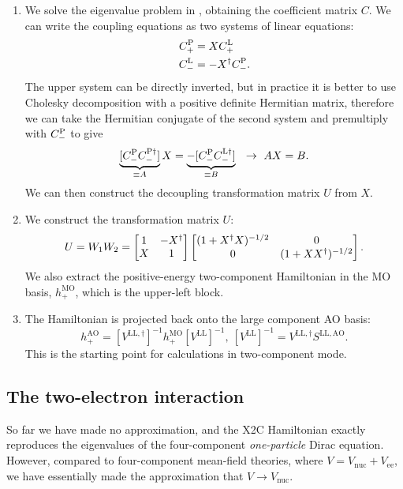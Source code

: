 \documentclass{article}
\begin{document}
\begin{enumerate}
\item We solve the eigenvalue problem in , obtaining the coefficient matrix $C$. We can write the coupling equations as two systems of linear equations:
\begin{align}
    C^{\mathrm{P}}_+&=XC^{\mathrm{L}}_+\\
    C^{\mathrm{L}}_-&=-X^{\dagger}C^{\mathrm{P}}_-.
\end{align}
The upper system can be directly inverted, but in practice it is better to use Cholesky decomposition with a positive definite Hermitian matrix, therefore we can take the Hermitian conjugate of the second system and premultiply with $C^{\mathrm{P}}_-$ to give
\begin{equation}
\label{eq:x_expr}
    \underbrace{[C\plc_- C_-^{\mathrm{P}\dagger}]}_{\equiv A}X = \underbrace{-[C_-\plc C_-^{\mathrm{L}\dagger}]}_{\equiv B} \ \ \rightarrow\ AX=B.
\end{equation}
We can then construct the decoupling transformation matrix $U$ from $X$.
\item We construct the transformation matrix $U$:
\begin{equation}
    U=W_1W_2=\begin{bmatrix}{1}&{-X^{\dagger}}\\{X}&{1}\end{bmatrix}\begin{bmatrix}{ (1+X^{\dagger}X)^{-1/2} }&{0}\\{0}&{ (1+XX^{\dagger})^{-1/2} }\end{bmatrix}.
\end{equation}
We also extract the positive-energy two-component Hamiltonian in the MO basis, $h^{\mathrm{MO}}_+$, which is the upper-left block.
\item The Hamiltonian is projected back onto the large component AO basis:
\begin{equation}
    h_+^{\mathrm{AO}}=[V^{\mathrm{LL},\dagger}]^{-1}h_+^{\mathrm{MO}}[V^{\mathrm{LL}}]^{-1},\ [V^{\mathrm{LL}}]^{-1}=V^{\mathrm{LL},\dagger}S^{\mathrm{LL, AO}}.
\end{equation}
This is the starting point for calculations in two-component mode.
\end{enumerate}

\subsection{The two-electron interaction}
So far we have made no approximation, and the X2C Hamiltonian exactly reproduces the eigenvalues of the four-component \textit{one-particle} Dirac equation. However, compared to four-component mean-field theories, where $V=V_{\mathrm{nuc}}+V_{\mathrm{ee}}$, we have essentially made the approximation that $V\rightarrow V_{\mathrm{nuc}}$.
\end{document}
